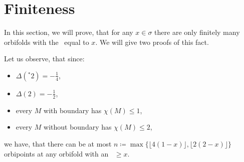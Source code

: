 
\section{Finiteness}\label{finiteness}

In this section, we will prove, that for any $x \in \sigma$ there are only finitely many orbifolds 
with the \Eoc\ equal to $x$. We will give two proofs of this fact. 







\begin{observation}\label{limit of number of orbipoints lemma}
Let us observe, that since:
\begin{itemize} 
\item $\Delta(^*2) = -\frac{1}{4}$,
\item $\Delta(2) = -\frac{1}{2}$,
\item every $M$ with boundary has $\chi(M) \leq 1$,
\item every $M$ without boundary has $\chi(M) \leq 2$,
\end{itemize}
we have, that there can be at most 
$n \coloneqq \max \{\lfloor 4(1-x) \rfloor, \lfloor 2(2-x) \rfloor\}$ 
orbipoints at any orbifold with an \Eoc\ $\geq x$. 
\end{observation}


